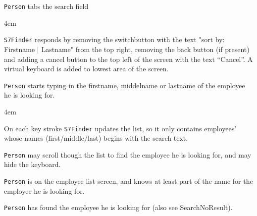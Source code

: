 \begin{description}[style=multiline,leftmargin=4cm,font=\normalfont]
    \item[\emph{Flow of events}]
         \begin{enumerate}
             \item \texttt{Person} tabs the search field

            {\leftskip4em
            \item \texttt{S7Finder} responds by removing the
              switchbutton with the text "sort by: Firstname $|$
              Lastname" from the top right, removing the back button
              (if present) and adding a cancel button to the top left
              of the screen with the text ``Cancel''. A virtual
              keyboard is added to lowest area of the screen.

            }
          \item \texttt{Person} starts typing in the firstname,
            middelname or lastname of the employee he is looking for.

            {\leftskip4em
            \item On each key stroke \texttt{S7Finder} updates the
              list, so it only contains employees' whose names
              (first/middle/last) begins with the search text.

            }
          \item \texttt{Person} may scroll though the list to find the
            employee he is looking for, and may hide the keyboard.

       \end{enumerate}

\end{description}

\usecaseline

\begin{description}[style=multiline,leftmargin=4cm,font=\normalfont]
\item[\emph{Entry condition}] \texttt{Person} is on the employee list
  screen, and knows at least part of the name for the employee he is
  looking for.
\end{description}

\usecaseline

\begin{description}[style=multiline,leftmargin=4cm,font=\normalfont]
    \item[\emph{Exit conditions}]
        \texttt{Person} has found the employee he is looking for (also see SearchNoResult).
\end{description}

